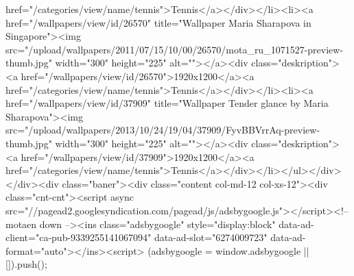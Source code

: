 href="/categories/view/name/tennis">Tennis</a></div></li><li><a href="/wallpapers/view/id/26570" title="Wallpaper Maria Sharapova in Singapore"><img src="/upload/wallpapers/2011/07/15/10/00/26570/mota_ru_1071527-preview-thumb.jpg" width="300" height="225" alt=""></a><div class="deskription"><a href="/wallpapers/view/id/26570">1920x1200</a><a href="/categories/view/name/tennis">Tennis</a></div></li><li><a href="/wallpapers/view/id/37909" title="Wallpaper Tender glance by Maria Sharapova"><img src="/upload/wallpapers/2013/10/24/19/04/37909/FyvBBVrrAq-preview-thumb.jpg" width="300" height="225" alt=""></a><div class="deskription"><a href="/wallpapers/view/id/37909">1920x1200</a><a href="/categories/view/name/tennis">Tennis</a></div></li></ul></div></div><div class="baner"><div class="content col-md-12 col-xs-12"><div class="cnt-cnt"><script async src="//pagead2.googlesyndication.com/pagead/js/adsbygoogle.js"></script><!-- motaen down --><ins class="adsbygoogle"
style="display:block"
data-ad-client="ca-pub-9339255141067094"
data-ad-slot="6274009723"
data-ad-format="auto"></ins><script>
(adsbygoogle = window.adsbygoogle || []).push({});
